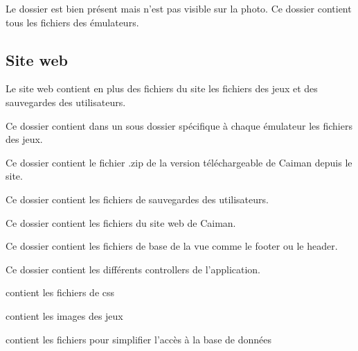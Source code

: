 \documentclass[a4paper,12pt,french]{sphinxmanual}
\begin{document}
\sphinxAtStartPar
Le dossier est bien présent mais n’est pas visible sur la photo. Ce dossier contient tous les fichiers des émulateurs.


\subsection{Site web}
\label{\detokenize{organique:site-web}}
\sphinxAtStartPar
Le site web contient en plus des fichiers du site les fichiers des jeux et des sauvegardes des utilisateurs.

\sphinxAtStartPar
{}

\sphinxAtStartPar
{}

\sphinxAtStartPar
Ce dossier contient dans un sous dossier spécifique à chaque émulateur les fichiers des jeux.

\sphinxAtStartPar
{}

\sphinxAtStartPar
Ce dossier contient le fichier .zip de la version téléchargeable de Caiman depuis le site.

\sphinxAtStartPar
{}

\sphinxAtStartPar
Ce dossier contient les fichiers de sauvegardes des utilisateurs.

\sphinxAtStartPar
{}

\sphinxAtStartPar
Ce dossier contient les fichiers du site web de Caiman.

\sphinxAtStartPar
{}

\sphinxAtStartPar
{}

\sphinxAtStartPar
Ce dossier contient les fichiers de base de la vue  comme le footer ou le header.

\sphinxAtStartPar
{}

\sphinxAtStartPar
Ce dossier contient les différents controllers de l’application.

\sphinxAtStartPar
{}

\sphinxAtStartPar
contient les fichiers de css

\sphinxAtStartPar
{}

\sphinxAtStartPar
contient les images des jeux

\sphinxAtStartPar
{}

\sphinxAtStartPar
contient les fichiers pour simplifier l’accès à la base de données
\end{document}
